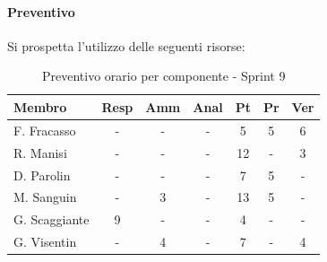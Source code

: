 \documentclass[a4paper,12pt]{article}
\begin{document}
\paragraph{Preventivo}
Si prospetta l'utilizzo delle seguenti risorse:

\begin{table}[H]
    \centering
    \renewcommand{\arraystretch}{1.3}
    \small 
    \begin{tabularx}{\textwidth}{|l|C|C|C|C|C|C|}
        \hline
        \textbf{Membro} & \textbf{Resp} & \textbf{Amm} & \textbf{Anal} & \textbf{Pt} & \textbf{Pr} & \textbf{Ver} \\
        \hline
        F. Fracasso & - & - & - & 5 & 5 & 6 \\
        \hline
        R. Manisi & - & - & - & 12 & - & 3 \\
        \hline
        D. Parolin & - & - & - & 7 & 5 & - \\
        \hline
        M. Sanguin & - & 3 & - & 13 & 5 & - \\
        \hline
        G. Scaggiante & 9 & - & - & 4 & - & - \\
        \hline
        G. Visentin & - & 4 & - & 7 & - & 4 \\
        \hline
    \end{tabularx}
    \caption{Preventivo orario per componente - Sprint 9}
    \label{tab:preventivo_sprint9}
\end{table}
\end{document}
